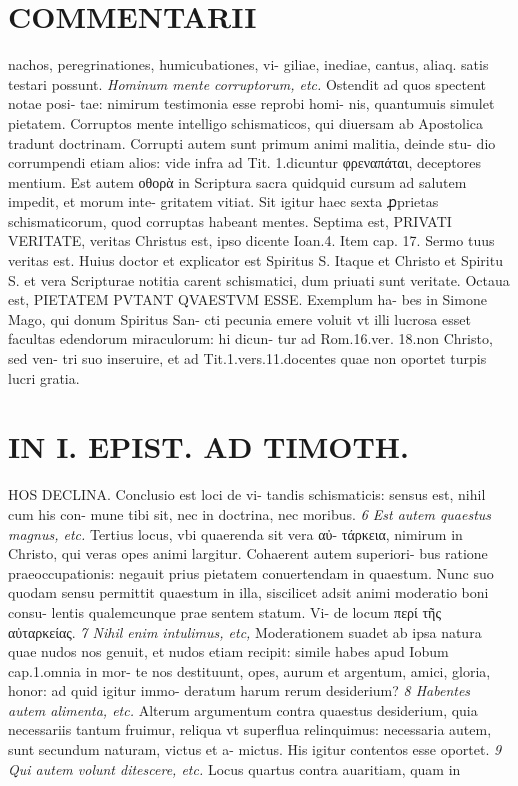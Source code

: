 \documentclass{article}
\begin{document}
\begin{pages}
\section*{COMMENTARII }
\marginpar{[ p.154 ]}\pstart nachos, peregrinationes, humicubationes, vi- giliae, inediae, cantus, aliaq. satis testari possunt.  \pend
\textit{Hominum mente corruptorum, etc. }\pstart Ostendit ad quos spectent notae posi- tae: nimirum testimonia esse reprobi homi- nis, quantumuis simulet pietatem. Corruptos mente intelligo schismaticos, qui diuersam ab Apostolica tradunt doctrinam. Corrupti autem sunt primum animi malitia, deinde stu- dio corrumpendi etiam alios: vide infra ad Tit. 1.dicuntur φρεναπάται, deceptores mentium.  \pend\pstart Est autem οθορὰ in Scriptura sacra quidquid cursum ad salutem impedit, et morum inte- gritatem vitiat. Sit igitur haec sexta ꝓprietas schismaticorum, quod corruptas habeant mentes.  \pend\pstart Septima est, PRIVATI VERITATE, veritas Christus est, ipso dicente Ioan.4. Item cap. 17. Sermo tuus veritas est. Huius doctor et explicator est Spiritus S. Itaque et Christo et Spiritu S. et vera Scripturae notitia carent schismatici, dum priuati sunt veritate.  \pend\pstart Octaua est, PIETATEM PVTANT QVAESTVM ESSE. Exemplum ha- bes in Simone Mago, qui donum Spiritus San- cti pecunia emere voluit vt illi lucrosa esset facultas edendorum miraculorum: hi dicun- tur ad Rom.16.ver. 18.non Christo, sed ven- tri suo inseruire, et ad Tit.1.vers.11.docentes quae non oportet turpis lucri gratia.  \pend
\section*{IN I. EPIST. AD TIMOTH. }
\marginpar{[ p.155 ]}\pstart HOS DECLINA. Conclusio est loci de vi- tandis schismaticis: sensus est, nihil cum his con- mune tibi sit, nec in doctrina, nec moribus.  \pend
\textit{6 Est autem quaestus magnus, etc. }\pstart Tertius locus, vbi quaerenda sit vera αὐ- τάρκεια, nimirum in Christo, qui veras opes animi largitur. Cohaerent autem superiori- bus ratione praeoccupationis: negauit prius pietatem conuertendam in quaestum. Nunc suo quodam sensu permittit quaestum in illa, siscilicet adsit animi moderatio boni consu- lentis qualemcunque prae sentem statum. Vi- de locum περί τῆς αὐταρκείας.  \pend
\textit{7 Nihil enim intulimus, etc, }\pstart Moderationem suadet ab ipsa natura quae nudos nos genuit, et nudos etiam recipit: simile habes apud Iobum cap.1.omnia in mor- te nos destituunt, opes, aurum et argentum, amici, gloria, honor: ad quid igitur immo- deratum harum rerum desiderium?  \pend
\textit{8 Habentes autem alimenta, etc. }\pstart Alterum argumentum contra quaestus desiderium, quia necessariis tantum fruimur, reliqua vt superflua relinquimus: necessaria autem, sunt secundum naturam, victus et a- mictus. His igitur contentos esse oportet.  \pend
\textit{9 Qui autem volunt ditescere, etc. }\pstart Locus quartus contra auaritiam, quam in  \pend

\end{pages}
\end{document}
